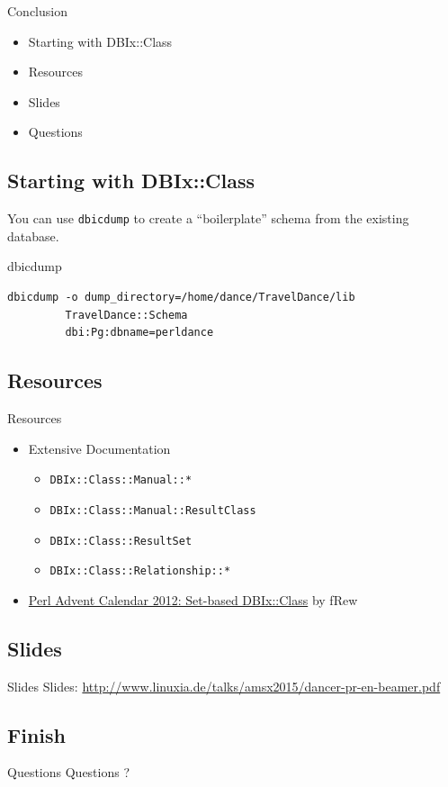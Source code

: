 \begin{frame}{Conclusion}
\begin{itemize}
\item Starting with DBIx::Class
\item Resources
\item Slides
\item Questions
\end{itemize}
\end{frame}

\subsection{Starting with DBIx::Class}

You can use \verb|dbicdump| to create a ``boilerplate'' schema from the
existing database.

\begin{frame}[fragile]{dbicdump}
\begin{lstlisting}
dbicdump -o dump_directory=/home/dance/TravelDance/lib 
         TravelDance::Schema 
         dbi:Pg:dbname=perldance
\end{lstlisting}
\end{frame}

\subsection{Resources}
\begin{frame}[fragile]{Resources}
\begin{itemize}
\item Extensive Documentation
\begin{itemize}
\item \verb|DBIx::Class::Manual::*|
\item \verb|DBIx::Class::Manual::ResultClass|
\item \verb|DBIx::Class::ResultSet|
\item \verb|DBIx::Class::Relationship::*|
\end{itemize}
\item \href{http://www.perladvent.org/2012/2012-12-21.html}
{Perl Advent Calendar 2012: Set-based DBIx::Class}
by fRew
\end{itemize}
\end{frame}

\subsection{Slides}

\begin{frame}{Slides}
Slides:
\url{http://www.linuxia.de/talks/amsx2015/dancer-pr-en-beamer.pdf}
\end{frame}

\subsection{Finish}

\begin{frame}{Questions}
\centering
Questions ?
\end{frame}



